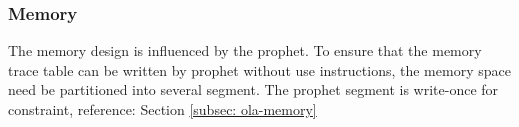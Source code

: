 \subsubsection{Memory} \label{sec:design-memory}

The memory design is influenced by the prophet.
To ensure that the memory trace table can be written by prophet without use instructions, the memory space need be partitioned into several segment.
The prophet segment is write-once for constraint,
reference: Section \ref{subsec: ola-memory}
